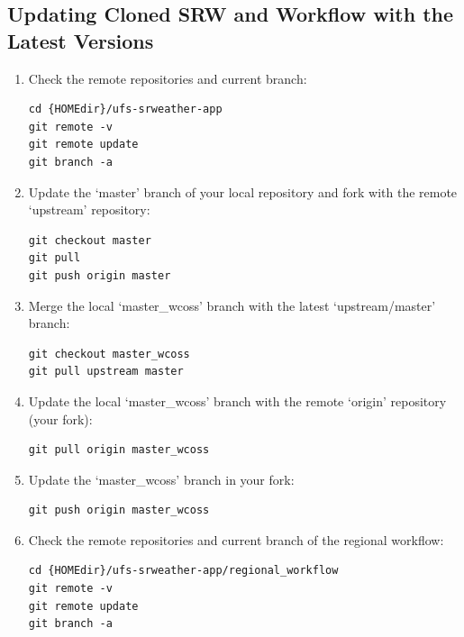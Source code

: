 \documentclass[11pt,fleqn]{report}              %
\begin{document}
\subsection{Updating Cloned SRW and Workflow with the Latest Versions}
\label{subsec:update_srw_regional_latest}

\begin{enumerate}

\item Check the remote repositories and current branch:
\lstset{language=bash}   
\begin{lstlisting}[frame=trBL]
cd {HOMEdir}/ufs-srweather-app
git remote -v
git remote update
git branch -a
\end{lstlisting}

\item Update the `master' branch of your local repository and fork with the remote `upstream' repository:
\lstset{language=bash}   
\begin{lstlisting}[frame=trBL]
git checkout master
git pull
git push origin master
\end{lstlisting}

\item Merge the local `master\_wcoss' branch with the latest `upstream/master' branch:
\lstset{language=bash}   
\begin{lstlisting}[frame=trBL]
git checkout master_wcoss
git pull upstream master
\end{lstlisting}

\item Update the local `master\_wcoss' branch with the remote `origin' repository (your fork):
\lstset{language=bash}   
\begin{lstlisting}[frame=trBL]
git pull origin master_wcoss
\end{lstlisting}

\item Update the `master\_wcoss' branch in your fork:
\lstset{language=bash}   
\begin{lstlisting}[frame=trBL]
git push origin master_wcoss
\end{lstlisting}

\item Check the remote repositories and current branch of the regional workflow:
\lstset{language=bash}   
\begin{lstlisting}[frame=trBL]
cd {HOMEdir}/ufs-srweather-app/regional_workflow
git remote -v
git remote update
git branch -a
\end{lstlisting}


\end{enumerate}
\end{document}
